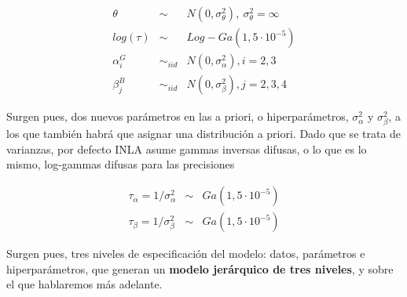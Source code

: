 \documentclass[
]{book}
\newenvironment{Shaded}{\begin{snugshade}}{\end{snugshade}}
\newcommand{\AttributeTok}[1]{\textcolor[rgb]{0.77,0.63,0.00}{#1}}
\newcommand{\CommentTok}[1]{\textcolor[rgb]{0.56,0.35,0.01}{\textit{#1}}}
\newcommand{\ConstantTok}[1]{\textcolor[rgb]{0.00,0.00,0.00}{#1}}
\newcommand{\FunctionTok}[1]{\textcolor[rgb]{0.00,0.00,0.00}{#1}}
\newcommand{\NormalTok}[1]{#1}
\newcommand{\OtherTok}[1]{\textcolor[rgb]{0.56,0.35,0.01}{#1}}
\newcommand{\SpecialCharTok}[1]{\textcolor[rgb]{0.00,0.00,0.00}{#1}}
\newcommand{\StringTok}[1]{\textcolor[rgb]{0.31,0.60,0.02}{#1}}
\begin{document}
\begin{eqnarray*}
\theta &\sim & N(0,\sigma_{\theta}^2), \ \sigma_{\theta}^2=\infty \\
log(\tau) &\sim & Log-Ga(1,5\cdot 10^{-5})\\
\alpha_i^G & \sim_{iid} & N(0,\sigma_{\alpha}^2), i=2,3 \\
\beta_j^B & \sim_{iid} & N(0,\sigma_{\beta}^2), j=2,3,4
\end{eqnarray*}

Surgen pues, dos nuevos parámetros en las a priori, o hiperparámetros, \(\sigma_{\alpha}^2\) y \(\sigma_{\beta}^2\), a los que también habrá que asignar una distribución a priori. Dado que se trata de varianzas, por defecto INLA asume gammas inversas difusas, o lo que es lo mismo, log-gammas difusas para las precisiones

\begin{eqnarray*}
\tau_{\alpha}=1/\sigma_{\alpha}^2 &\sim & Ga(1,5\cdot 10^{-5}) \\
\tau_{\beta}=1/\sigma_{\beta}^2 &\sim & Ga(1,5\cdot 10^{-5})
\end{eqnarray*}

Surgen pues, tres niveles de especificación del modelo: datos, parámetros e hiperparámetros, que generan un \textbf{modelo jerárquico de tres niveles}, y sobre el que hablaremos más adelante.

\begin{Shaded}
\end{Shaded}
\end{document}
